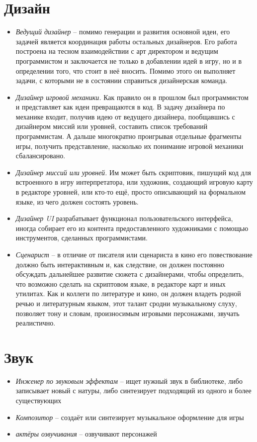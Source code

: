 \section{Дизайн}
\begin{itemize}
    \item \emph{Ведущий дизайнер} -- помимо генерации и развития основной идеи, его задачей является
        координация работы остальных дизайнеров. Его работа построена на тесном взаимодействии с арт
        директором и ведущим программистом и заключается не только в добавлении идей в игру, но и в
        определении того, что стоит в неё вносить. Помимо этого он выполняет задачи, с которыми не в
        состоянии справиться дизайнерская команда.
    \item \emph{Дизайнер игровой механики.} Как правило он в прошлом был программистом и представляет как
        идеи превращаются в код. В задачу дизайнера по механике входит, получив идею от ведущего дизайнера,
        пообщавшись с дизайнером миссий или уровней, составить список требований программистам. А дальше
        многократно проигрывая отдельные фрагменты игры, получить представление, насколько их понимание
        игровой механики сбалансировано.
    \item \emph{Дизайнер миссий или уровней.} Им может быть скриптовик, пишущий код для встроенного в игру
        интерпретатора, или художник, создающий игровую карту в редакторе уровней, или кто-то ещё, просто
        описывающий на формальном языке, из чего должен состоять уровень.
    \item \emph{Дизайнер UI} разрабатывает функционал пользовательского интерфейса, иногда собирает его из
        контента предоставленного художниками с помощью инструментов, сделанных программистами.
    \item \emph{Сценарист} -- в отличие от писателя или сценариста в кино его повествование должно быть
        интерактивным и, как следствие, он должен постоянно обсуждать дальнейшее развитие сюжета с
        дизайнерами, чтобы определить, что возможно сделать на скриптовом языке, в редакторе карт и иных
        утилитах. Как и коллеги по литературе и кино, он должен владеть родной речью и литературным языком,
        этот талант сродни музыкальному слуху, позволяет тону и словам, произносимым игровыми персонажами,
        звучать реалистично.
\end{itemize}

\section{Звук}
\begin{itemize}
    \item \emph{Инженер по звуковым эффектам} -- ищет нужный звук в библиотеке, либо записывает новый с
        натуры, либо синтезирует подходящий из одного и более существующих
    \item \emph{Композитор} -- создаёт или синтезирует музыкальное оформление для игры
    \item \emph{актёры озвучивания} -- озвучивают персонажей
\end{itemize}

